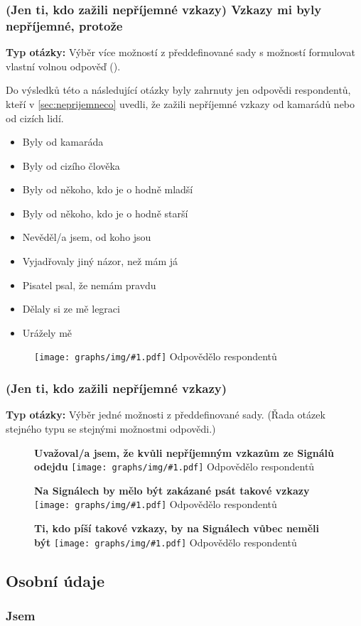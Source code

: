 \documentclass[12pt, a4paper, twoside]{article}
\newcommand{\answercount}[1]{Odpovědělo  respondentů}
\newcommand{\includegraph}[2]{
  \begin{figure}[H]
    \centering
    \textbf{#2}
    \texttt{[image: graphs/img/\#1.pdf]}
    \answercount{#1}
  \end{figure}
}
\newcommand{\qtype}{\textbf{Typ otázky:}
}
\newcommand{\pickOne}{Výběr jedné možnosti z předdefinované sady\xspace}
\newcommand{\pickMultiple}{Výběr více možností z předdefinované sady\xspace}
\newcommand{\withOther}{s možností formulovat vlastní volnou odpověď (\uv{Jiné})\xspace}
\newcommand{\series}{(Řada otázek stejného typu se stejnými možnostmi odpovědi.)\xspace}
\begin{document}
\subsubsection{(Jen ti, kdo zažili nepříjemné vzkazy) Vzkazy mi byly nepříjemné, protože}

\qtype \pickMultiple \withOther.

Do výsledků této a následující otázky byly zahrnuty
jen odpovědi respondentů,
kteří v \ref{sec:neprijemneco} uvedli, že zažili nepříjemné vzkazy
od kamarádů nebo od cizích lidí.

\begin{itemize}
\item Byly od kamaráda
\item Byly od cizího člověka
\item Byly od někoho, kdo je o hodně mladší
\item Byly od někoho, kdo je o hodně starší
\item Nevěděl/a jsem, od koho jsou
\item Vyjadřovaly jiný názor, než mám já
\item Pisatel psal, že nemám pravdu
\item Dělaly si ze mě legraci
\item Urážely mě
\end{itemize}

\includegraph{neprijemne_vzkazy_protoze}{}

\subsubsection{(Jen ti, kdo zažili nepříjemné vzkazy)}

\qtype \pickOne. \series

\includegraph{neprijemne_vzkazy_zvazoval_odchod}{Uvažoval/a jsem, že kvůli nepříjemným vzkazům ze Signálů odejdu}

\includegraph{neprijemne_vzkazy_zakazat}{Na Signálech by mělo být zakázané psát takové vzkazy}

\includegraph{neprijemne_vzkazy_pisatele_pryc}{Ti, kdo píší takové vzkazy, by na Signálech vůbec neměli být}

\subsection{Osobní údaje}\label{sec:osobni}

\subsubsection{Jsem}\label{sec:pohlavi}
\end{document}
